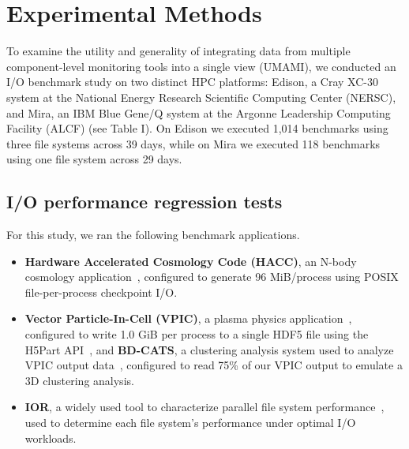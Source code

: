 

\section{Experimental Methods} \label{sec:platforms}

To examine the utility and generality of integrating data from multiple
component-level monitoring tools into a single view (UMAMI), we conducted an
I/O benchmark study on two distinct HPC platforms:
Edison, a Cray XC-30 system at the National Energy Research Scientific
Computing Center (NERSC), and Mira, an IBM Blue Gene/Q system at the Argonne
Leadership Computing Facility (ALCF) (see Table I).  On Edison we executed
1,014 benchmarks using three file systems across 39 days, while on
Mira we executed 118 benchmarks using one file system across 29 days.

\subsection{I/O performance regression tests} \label{sec:methods/tests}

\noindent
For this study, we ran the following benchmark applications.

\begin{itemize}[leftmargin=*]
\item 
\textbf{Hardware Accelerated Cosmology Code (HACC)}, an N-body cosmology application~\cite{habib2012}, configured to generate 96 MiB/process using POSIX file-per-process checkpoint I/O.
 \item
\textbf{Vector Particle-In-Cell (VPIC)}, a plasma physics application~\cite{Bowers2008}, configured to write 1.0 GiB per process to a single HDF5 file using the H5Part API~\cite{H5Part}, and 
\textbf{BD-CATS}, a clustering analysis system used to analyze VPIC output data~\cite{Patwary2015}, configured to read 75\% of our VPIC output to emulate a 3D clustering analysis.
\item
\textbf{IOR}, a widely used tool to characterize parallel file system performance~\cite{Yildiz2016,Xie2012,Lofstead2010,Uselton2010}, used to determine each file system's performance under optimal I/O workloads.
 \end{itemize}

